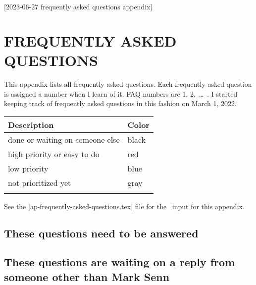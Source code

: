 [2023-06-27 frequently asked questions appendix]

\newcommand{\MyA}{\textbf{A: }}

\makeatletter
\newcommand{\faq}[2]
  {%
    \vspace{6pt}
    \noindent
    {%
      \bfseries
      \ifthen{\equal{high}{#2}}{\color{red}}%
      \ifthen{\equal{low}{#2}}{\color{blue}}%
      \ifthen{\equal{answered}{#2}}{\color{black}}%
      \ifthen{\equal{done}{#2}}{\color{black}}%
      \ifthen{\equal{fixed}{#2}}{\color{black}}%
      \ifthen{\equal{wait}{#2}}{\color{black}}%
      \ifthen{\equal{not}{#2}}{\color{gray}}%
      {\fontsize{9}{10}\reset@font\bf FAQ}
      #1.
    }%
    \ignorespaces
  }
\makeatother
  
\chapter{FREQUENTLY ASKED QUESTIONS}

This appendix lists all frequently asked questions.
Each frequently asked question is assigned a number when I learn of it.
FAQ numbers are 1, 2,~\ldots~.
I started keeping track
of frequently asked questions
in this fashion
on March 1, 2022.

\begin{tabular}{@{}ll@{}}
  \toprule
  \bf Description& \bf Color\\
  \midrule
  done or waiting on someone else& \color{black}black\\
  high priority or easy to do& \color{red}red\\
  low priority& \color{blue}blue\\
  not prioritized yet& \color{gray}gray\\
  \bottomrule\\
\end{tabular}

See the
|ap-frequently-asked-questions.tex|
file
for the \LuaLaTeXLogo\ input
for this appendix.


\section{These questions need to be answered}


\section{These questions are waiting on a reply from someone other than Mark Senn}


